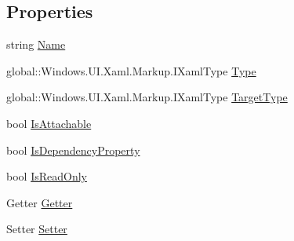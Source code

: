 \subsection*{Properties}
\begin{DoxyCompactItemize}
\item 
string \hyperlink{class_e_l_i_client_1_1_e_l_i_client___xaml_type_info_1_1_xaml_member_a9c6b7c4e4e1add3d1ac53cc92a6951ef}{Name}
\item 
global\+::\+Windows.\+U\+I.\+Xaml.\+Markup.\+I\+Xaml\+Type \hyperlink{class_e_l_i_client_1_1_e_l_i_client___xaml_type_info_1_1_xaml_member_a98412c6f1729ec230ac2a495196ddebe}{Type}
\item 
global\+::\+Windows.\+U\+I.\+Xaml.\+Markup.\+I\+Xaml\+Type \hyperlink{class_e_l_i_client_1_1_e_l_i_client___xaml_type_info_1_1_xaml_member_a050954ae2435d04214ca272389d26d72}{Target\+Type}
\item 
bool \hyperlink{class_e_l_i_client_1_1_e_l_i_client___xaml_type_info_1_1_xaml_member_a6807c98a4636a6b56f6526dbf01de4d2}{Is\+Attachable}
\item 
bool \hyperlink{class_e_l_i_client_1_1_e_l_i_client___xaml_type_info_1_1_xaml_member_a67fc2163e5344add0f31cf1ee409cdb9}{Is\+Dependency\+Property}
\item 
bool \hyperlink{class_e_l_i_client_1_1_e_l_i_client___xaml_type_info_1_1_xaml_member_a0f16b7e57065e39f31a3a80f5f85b7a0}{Is\+Read\+Only}
\item 
Getter \hyperlink{class_e_l_i_client_1_1_e_l_i_client___xaml_type_info_1_1_xaml_member_a69e898790e601cc05e235435bcc84295}{Getter}
\item 
Setter \hyperlink{class_e_l_i_client_1_1_e_l_i_client___xaml_type_info_1_1_xaml_member_a554e51b3851dbbbe7910bfba15667125}{Setter}
\end{DoxyCompactItemize}
